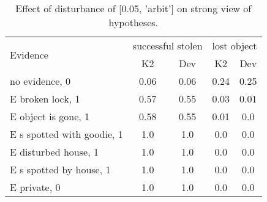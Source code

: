 \begin{table}\begin{tabular}{l|cc|cc}\toprule\multirow{2}{*}{Evidence} & \multicolumn{2}{c}{successful stolen}& \multicolumn{2}{c}{lost object}\\& {K2} & {Dev}& {K2} & {Dev}\\\midrule
no evidence, 0 & 0.06&0.06&0.24&0.25\\E broken lock, 1 & 0.57&0.55&0.03&0.01\\E object is gone, 1 & 0.58&0.55&0.01&0.0\\E s spotted with goodie, 1 & 1.0&1.0&0.0&0.0\\E disturbed house, 1 & 1.0&1.0&0.0&0.0\\E s spotted by house, 1 & 1.0&1.0&0.0&0.0\\E private, 0 & 1.0&1.0&0.0&0.0\\\bottomrule\end{tabular}\caption{Effect of disturbance of [0.05, 'arbit'] on strong view of hypotheses.}\end{table}